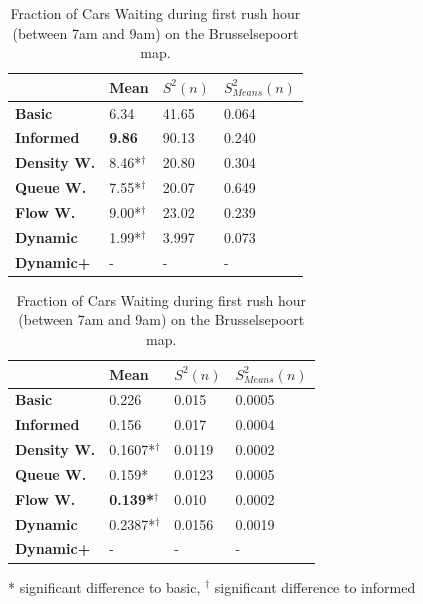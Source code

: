 \documentclass[11pt]{article}
\begin{document}
\begin{table}[h]
\centering
\caption{Average Velocity of Cars during first rush hour (between 7am and 9am) on the Brusselsepoort map.}
\label{tab:velo-morning-brussel}
\begin{tabular}{l|l|l|l|}
\textbf{}                 & \textbf{Mean} & \textbf{$S^2(n)$} & \textbf{$S_{Means}^2(n)$} \\
\hline\textbf{Basic}            & 6.34          & 41.65             & 0.064                      \\
\textbf{Informed}         & \textbf{9.86}          & 90.13             & 0.240                      \\
\hline\textbf{Density W.} & 8.46*$^\dagger$          & 20.80             & 0.304                      \\
\textbf{Queue W.}   & 7.55*$^\dagger$          & 20.07             & 0.649                      \\
\textbf{Flow W.}    & 9.00*$^\dagger$          & 23.02             & 0.239                      \\
\textbf{Dynamic}          & 1.99*$^\dagger$          & 3.997             & 0.073                      \\
\textbf{Dynamic+}         & -             & -                 & -                    
\end{tabular}
\vspace{20pt}
\centering
\caption{Fraction of Cars Waiting during first rush hour (between 7am and 9am) on the Brusselsepoort map.}
\label{tab:waiting-morning-brussel}
\begin{tabular}{l|l|l|l|}
\textbf{}                 & \textbf{Mean} & \textbf{$S^2(n)$} & \textbf{$S_{Means}^2(n)$} \\
\hline\textbf{Basic}      & 0.226          & 0.015             & 0.0005                     \\
\textbf{Informed}   & 0.156          & 0.017             & 0.0004                     \\
\hline\textbf{Density W.} & 0.1607*$^\dagger$         & 0.0119            & 0.0002                     \\
\textbf{Queue W.}   & 0.159*          & 0.0123            & 0.0005                     \\
\textbf{Flow W.}    & \textbf{0.139*$^\dagger$} & 0.010             & 0.0002                     \\
\textbf{Dynamic}    & 0.2387*$^\dagger$         & 0.0156            & 0.0019                     \\
\textbf{Dynamic+}   & -              & -                 & -                         
\end{tabular}

\small{* significant difference to basic, $^\dagger$ significant difference to informed}
\end{table}
\end{document}
